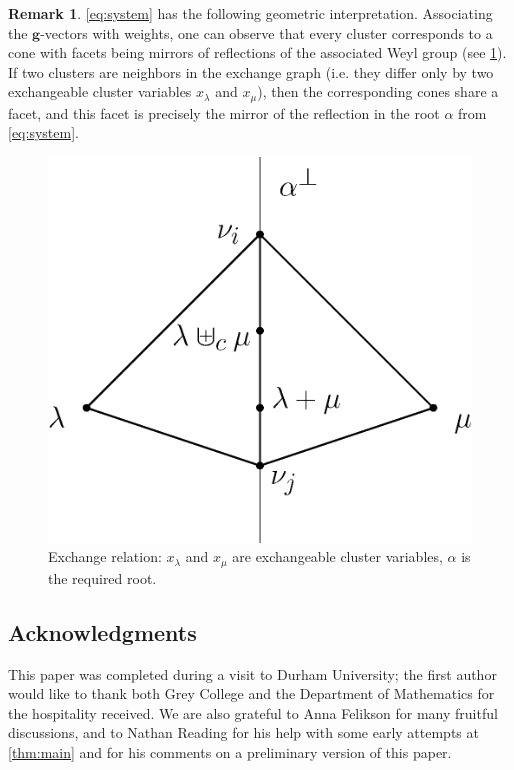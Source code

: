 \documentclass[11pt]{amsart}
\newcommand{\bg}{\mathbf{g}}
\theoremstyle{definition}
\newtheorem{remark}[theorem]{Remark}
\numberwithin{equation}{section}
\numberwithin{figure}{section}
\begin{document}
  \begin{remark}
    \label{geom}
    \cref{eq:system} has the following geometric interpretation.
    Associating the $\bg$-vectors with weights, one can observe that every cluster corresponds to a cone with facets being mirrors of reflections of the associated Weyl group (see \cref{fig:exchange_relation}).
    If two clusters are neighbors in the exchange graph (i.e. they differ only by two exchangeable cluster variables $x_\lambda$ and $x_\mu$), then the corresponding cones share a facet, and this facet is precisely the mirror of the reflection in the root $\alpha$ from \cref{eq:system}.
   \begin{figure}[h]
      \begin{center}
        \includegraphics[scale=0.4]{cones-section.eps}
      \end{center}
      \caption{Exchange relation: $x_\lambda$ and $x_\mu$ are exchangeable cluster variables, $\alpha$ is the required root.}
      \label{fig:exchange_relation}
    \end{figure}
\end{remark} 
 
\subsection*{Acknowledgments}
  This paper was completed during a visit to Durham University; the first author would like to thank both Grey College and the Department of Mathematics for the hospitality received.
  We are also grateful to Anna Felikson for many fruitful discussions, and to Nathan Reading for his help with some early attempts at \cref{thm:main} and for his comments on a preliminary version of this paper.
 
\end{document}
